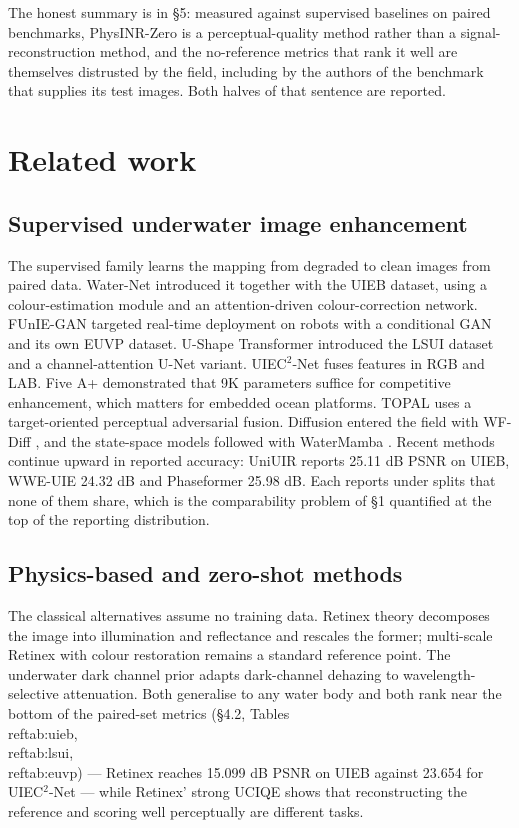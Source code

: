 \documentclass[journal]{IEEEtran}
\begin{document}
The honest summary is in \S{}5: measured against supervised baselines on paired benchmarks, PhysINR-Zero is a perceptual-quality method rather than a signal-reconstruction method, and the no-reference metrics that rank it well are themselves distrusted by the field, including by the authors of the benchmark that supplies its test images. Both halves of that sentence are reported.


\section{Related work}
\subsection{Supervised underwater image enhancement}
The supervised family learns the mapping from degraded to clean images from paired data. Water-Net \cite{li2020uieb} introduced it together with the UIEB dataset, using a colour-estimation module and an attention-driven colour-correction network. FUnIE-GAN \cite{islam2020funie} targeted real-time deployment on robots with a conditional GAN and its own EUVP dataset. U-Shape Transformer \cite{peng2023ushape} introduced the LSUI dataset and a channel-attention U-Net variant. UIEC$^{2}$-Net \cite{wang2021uiec2} fuses features in RGB and LAB. Five A+ \cite{jiang2023fivea} demonstrated that 9K parameters suffice for competitive enhancement, which matters for embedded ocean platforms. TOPAL \cite{jiang2022topal} uses a target-oriented perceptual adversarial fusion. Diffusion entered the field with WF-Diff \cite{zhao2024wfdiff}, and the state-space models followed with WaterMamba \cite{guan2024watermamba}. Recent methods continue upward in reported accuracy: UniUIR \cite{zhang2025uniuir} reports 25.11 dB PSNR on UIEB, WWE-UIE \cite{cheng2026wweuie} 24.32 dB and Phaseformer \cite{khan2025phaseformer} 25.98 dB. Each reports under splits that none of them share, which is the comparability problem of \S{}1 quantified at the top of the reporting distribution.

\subsection{Physics-based and zero-shot methods}
The classical alternatives assume no training data. Retinex theory \cite{jobson1997msr} decomposes the image into illumination and reflectance and rescales the former; multi-scale Retinex with colour restoration remains a standard reference point. The underwater dark channel prior \cite{drews2013udcp} adapts dark-channel dehazing to wavelength-selective attenuation. Both generalise to any water body and both rank near the bottom of the paired-set metrics (\S{}4.2, Tables~\\ref{tab:uieb},~\\ref{tab:lsui},~\\ref{tab:euvp}) --- Retinex reaches 15.099 dB PSNR on UIEB against 23.654 for UIEC$^{2}$-Net --- while Retinex' strong UCIQE shows that reconstructing the reference and scoring well perceptually are different tasks.
\end{document}
